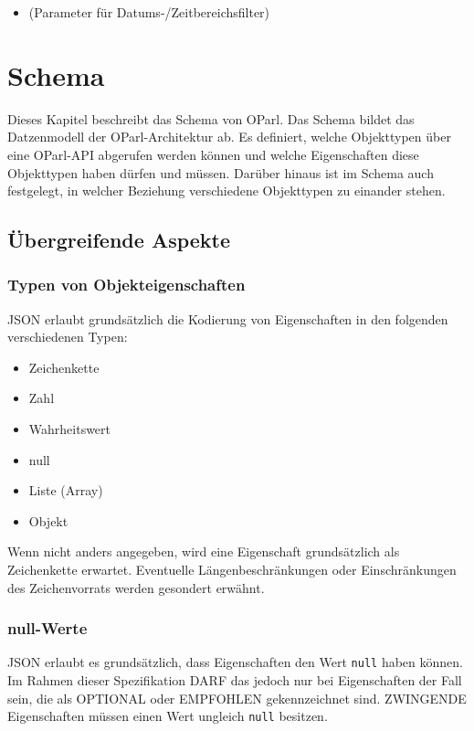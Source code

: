 \documentclass[,a4paper]{article}
\begin{document}
\begin{itemize}
\item
  (Parameter für Datums-/Zeitbereichsfilter)
\end{itemize}

\section{Schema}

Dieses Kapitel beschreibt das Schema von OParl. Das Schema bildet das
Datzenmodell der OParl-Architektur ab. Es definiert, welche Objekttypen
über eine OParl-API abgerufen werden können und welche Eigenschaften
diese Objekttypen haben dürfen und müssen. Darüber hinaus ist im Schema
auch festgelegt, in welcher Beziehung verschiedene Objekttypen zu
einander stehen.

\subsection{Übergreifende Aspekte}

\subsubsection{Typen von Objekteigenschaften}

JSON erlaubt grundsätzlich die Kodierung von Eigenschaften in den
folgenden verschiedenen Typen:

\begin{itemize}
\item
  Zeichenkette
\item
  Zahl
\item
  Wahrheitswert
\item
  null
\item
  Liste (Array)
\item
  Objekt
\end{itemize}

Wenn nicht anders angegeben, wird eine Eigenschaft grundsätzlich als
Zeichenkette erwartet. Eventuelle Längenbeschränkungen oder
Einschränkungen des Zeichenvorrats werden gesondert erwähnt.

\subsubsection{null-Werte}

JSON erlaubt es grundsätzlich, dass Eigenschaften den Wert \texttt{null}
haben können. Im Rahmen dieser Spezifikation DARF das jedoch nur bei
Eigenschaften der Fall sein, die als OPTIONAL oder EMPFOHLEN
gekennzeichnet sind. ZWINGENDE Eigenschaften müssen einen Wert ungleich
\texttt{null} besitzen.
\end{document}
